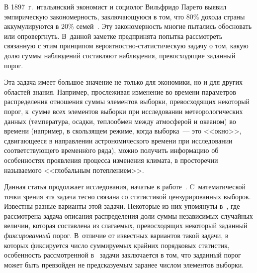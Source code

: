   
\vspace*{-4pt}



\thispagestyle{headings}

\begin{multicols}{2}

\label{st\stat}


В 1897~г.\ итальянский экономист и социолог Вильфридо Парето выявил 
эмпирическую закономерность, заключающуюся в том, что 80\%  дохода страны 
аккумулируются в 20\% семей~\cite{Koch1998}. Эту закономерность многие 
пытались обосновать или опровергнуть. В~данной заметке предпринята попытка 
рассмотреть связанную с этим принципом  
ве\-ро\-ят\-ност\-но-ста\-ти\-сти\-че\-скую задачу о том, какую долю суммы 
наблюдений составляют наблюдения, превосходящие заданный порог.

Эта задача имеет большое значение не только для экономики, но и для других 
областей знания. Например, прослеживая изменение во времени параметров 
распределения отношения суммы элементов выборки, превосходящих некоторый 
порог, к~сумме всех элементов выборки при исследовании метеорологических 
данных (температура, осадки, теплообмен между атмосферой и океаном) во 
времени (например, в скользящем режиме, когда выборка~--- это <<окно>>, 
сдвигающееся в направлении астрономического времени при исследовании 
соответствующего временн$\acute{\mbox{о}}$го ряда), можно получить информацию 
об особенностях проявления процесса изменения климата, в просторечии 
называемого <<глобальным потеплением>>.

Данная статья продолжает исследования, начатые в работе~\cite{Korolev2020}. 
C~математической точки зрения эта задача тесно связана со статистикой 
цензурированных выборок. Известны разные варианты этой задачи. Некоторые из 
них упомянуты в~\cite{Korolev2020}, где рассмотрена задача описания 
распределения доли суммы независимых случайных величин, которая составлена из 
слагаемых, превосходящих некоторый заданный \textit{фиксированный} порог. 
В~отличие от известных вариантов такой задачи, в которых фиксируется число 
суммируемых крайних порядковых статистик, особенность рассмотренной 
в~\cite{Korolev2020} задачи заключается в том, что заданный порог может быть 
превзойден не предсказуемым заранее числом элементов выборки. 


\end{multicols}
